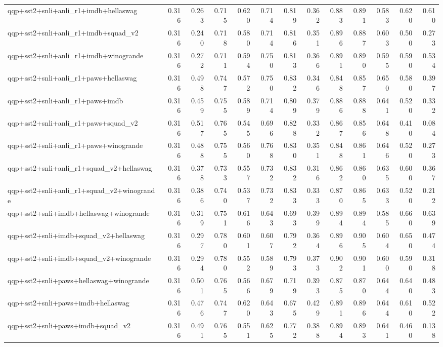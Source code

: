 \begin{table}[t]
\begin{tabular}{lrrrrrrrrrrrr}
    qqp+sst2+snli+anli\_r1+imdb+hellaswag & 0.316 & 0.263 & 0.715 & 0.620 & 0.714 & 0.819 & 0.362 & 0.883 & 0.891 & 0.583 & 0.620 & 0.610 \\
    qqp+sst2+snli+anli\_r1+imdb+squad\_v2 & 0.316 & 0.240 & 0.718 & 0.580 & 0.714 & 0.816 & 0.351 & 0.896 & 0.887 & 0.603 & 0.500 & 0.273 \\
    qqp+sst2+snli+anli\_r1+imdb+winogrande & 0.316 & 0.272 & 0.711 & 0.594 & 0.750 & 0.813 & 0.366 & 0.891 & 0.890 & 0.595 & 0.590 & 0.534 \\
    qqp+sst2+snli+anli\_r1+paws+hellaswag & 0.316 & 0.498 & 0.747 & 0.572 & 0.750 & 0.832 & 0.346 & 0.848 & 0.857 & 0.650 & 0.580 & 0.397 \\
    qqp+sst2+snli+anli\_r1+paws+imdb & 0.316 & 0.459 & 0.755 & 0.589 & 0.714 & 0.809 & 0.379 & 0.886 & 0.888 & 0.641 & 0.520 & 0.332 \\
    qqp+sst2+snli+anli\_r1+paws+squad\_v2 & 0.316 & 0.517 & 0.765 & 0.545 & 0.696 & 0.828 & 0.332 & 0.867 & 0.856 & 0.648 & 0.410 & 0.084 \\
    qqp+sst2+snli+anli\_r1+paws+winogrande & 0.316 & 0.488 & 0.755 & 0.560 & 0.768 & 0.830 & 0.351 & 0.848 & 0.861 & 0.646 & 0.520 & 0.273 \\
    qqp+sst2+snli+anli\_r1+squad\_v2+hellaswag & 0.316 & 0.378 & 0.733 & 0.557 & 0.732 & 0.832 & 0.316 & 0.862 & 0.860 & 0.635 & 0.600 & 0.367 \\
    qqp+sst2+snli+anli\_r1+squad\_v2+winogrande & 0.316 & 0.386 & 0.740 & 0.537 & 0.732 & 0.833 & 0.333 & 0.870 & 0.865 & 0.633 & 0.520 & 0.212 \\
    qqp+sst2+snli+imdb+hellaswag+winogrande & 0.316 & 0.319 & 0.751 & 0.616 & 0.643 & 0.693 & 0.399 & 0.894 & 0.894 & 0.585 & 0.660 & 0.639 \\
    qqp+sst2+snli+imdb+squad\_v2+hellaswag & 0.316 & 0.297 & 0.780 & 0.601 & 0.607 & 0.792 & 0.364 & 0.896 & 0.905 & 0.604 & 0.650 & 0.474 \\
    qqp+sst2+snli+imdb+squad\_v2+winogrande & 0.316 & 0.294 & 0.780 & 0.552 & 0.589 & 0.793 & 0.373 & 0.902 & 0.901 & 0.600 & 0.590 & 0.318 \\
    qqp+sst2+snli+paws+hellaswag+winogrande & 0.316 & 0.501 & 0.765 & 0.566 & 0.679 & 0.719 & 0.393 & 0.875 & 0.870 & 0.644 & 0.640 & 0.483 \\
    qqp+sst2+snli+paws+imdb+hellaswag & 0.316 & 0.476 & 0.747 & 0.620 & 0.643 & 0.675 & 0.429 & 0.891 & 0.896 & 0.644 & 0.610 & 0.522 \\
    qqp+sst2+snli+paws+imdb+squad\_v2 & 0.316 & 0.491 & 0.765 & 0.551 & 0.625 & 0.772 & 0.388 & 0.894 & 0.893 & 0.641 & 0.460 & 0.138 \\

\end{tabular}
\end{table}
